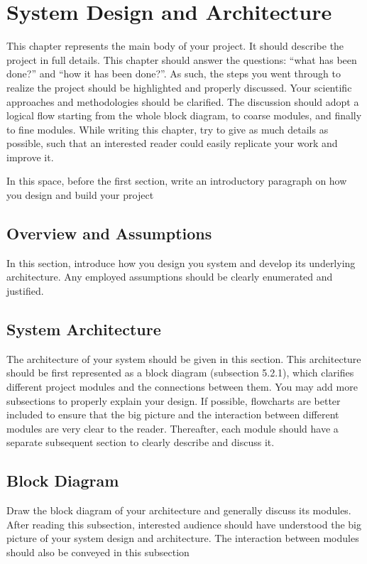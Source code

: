 \section{System Design and Architecture}
This chapter represents the main body of your project. It should describe the project in full details. This chapter should answer the questions: “what has been done?” and “how it has been done?”. As such, the steps you went through to realize the project should be highlighted and properly discussed. Your scientific approaches and methodologies should be clarified. The discussion should adopt a logical flow starting from the whole block diagram, to coarse modules, and finally to fine modules. While writing this chapter, try to give as much details as possible, such that an interested reader could easily replicate your work and improve it.

In this space, before the first section, write an introductory paragraph on how you design and build your project


\subsection{Overview and Assumptions}In this section, introduce how you design you system and develop its underlying architecture. Any employed assumptions should be clearly enumerated and justified.

\subsection{System Architecture}
The architecture of your system should be given in this section. This architecture should be first represented as a block diagram (subsection 5.2.1), which clarifies different project modules and the connections between them. You may add more subsections to properly explain your design. If possible, flowcharts are better included to ensure that the big picture and the interaction between different modules are very clear to the reader. Thereafter, each module should have a separate subsequent section to clearly describe and discuss it.

\subsection{Block Diagram}
Draw the block diagram of your architecture and generally discuss its modules. After reading this subsection, interested audience should have understood the big picture of your system design and architecture. The interaction between modules should also be conveyed in this subsection

